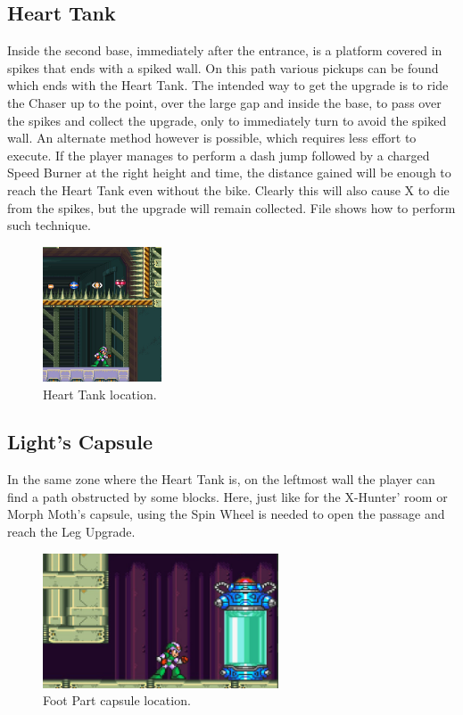 \subsection{Heart Tank}
Inside the second base, immediately after the entrance, is a platform covered in spikes that ends with a spiked wall. On this path various pickups can be found which ends with the Heart Tank. The intended way to get the upgrade is to ride the Chaser up to the point, over the large gap and inside the base, to pass over the spikes and collect the upgrade, only to immediately turn to avoid the spiked wall. An alternate method however is possible, which requires less effort to execute. If the player manages to perform a dash jump followed by a charged Speed Burner at the right height and time, the distance gained will be enough to reach the Heart Tank even without the bike. Clearly this will also cause X to die from the spikes, but the upgrade will remain collected. File  shows how to perform such technique.
\begin{figure}[htp]
	\centering
	\includegraphics[height=4cm]{figures/X2/Overdrive_ostrich/Ostrich_heart.png}
	\caption{Heart Tank location.}
\end{figure}

\subsection{Light's Capsule}\label{X2:Foot_parts}
In the same zone where the Heart Tank is, on the leftmost wall the player can find a path obstructed by some blocks. Here, just like for the X-Hunter' room or Morph Moth's capsule, using the Spin Wheel is needed to open the passage and reach the Leg Upgrade.
\begin{figure}[htp]
	\centering
	\includegraphics[height=4cm]{figures/X2/Overdrive_ostrich/Ostrich_capsule.jpg}
	\caption{Foot Part capsule location.}
\end{figure}

